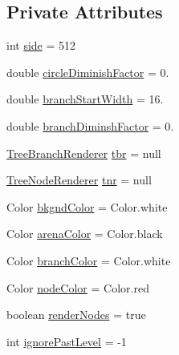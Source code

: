 \subsection*{Private Attributes}
\begin{DoxyCompactItemize}
\item 
int \hyperlink{classorg_1_1jgap_1_1util_1_1tree_1_1_tree_visualizer_a781fb40c6010a7b7da02446826b1d92a}{side} = 512
\item 
double \hyperlink{classorg_1_1jgap_1_1util_1_1tree_1_1_tree_visualizer_a3ff42c595d610aaa23f2102a0a590930}{circle\-Diminish\-Factor} = 0.
\item 
double \hyperlink{classorg_1_1jgap_1_1util_1_1tree_1_1_tree_visualizer_a4ddc046f06eb478f9fdf02ece6177acd}{branch\-Start\-Width} = 16.
\item 
double \hyperlink{classorg_1_1jgap_1_1util_1_1tree_1_1_tree_visualizer_a6022c22665671a626286f6b837759679}{branch\-Diminsh\-Factor} = 0.
\item 
\hyperlink{interfaceorg_1_1jgap_1_1util_1_1tree_1_1_tree_branch_renderer}{Tree\-Branch\-Renderer} \hyperlink{classorg_1_1jgap_1_1util_1_1tree_1_1_tree_visualizer_a3df4f6da758083da9c844f0f46d81b31}{tbr} = null
\item 
\hyperlink{interfaceorg_1_1jgap_1_1util_1_1tree_1_1_tree_node_renderer}{Tree\-Node\-Renderer} \hyperlink{classorg_1_1jgap_1_1util_1_1tree_1_1_tree_visualizer_a506cac5d7eb4e280016146f321b921fa}{tnr} = null
\item 
Color \hyperlink{classorg_1_1jgap_1_1util_1_1tree_1_1_tree_visualizer_a9ea1406597b394ba784c5a95c6c5b648}{bkgnd\-Color} = Color.\-white
\item 
Color \hyperlink{classorg_1_1jgap_1_1util_1_1tree_1_1_tree_visualizer_a8712811664d9f38c502af5612d001021}{arena\-Color} = Color.\-black
\item 
Color \hyperlink{classorg_1_1jgap_1_1util_1_1tree_1_1_tree_visualizer_adc14970d9e51cd9ac7ec634891cdcc93}{branch\-Color} = Color.\-white
\item 
Color \hyperlink{classorg_1_1jgap_1_1util_1_1tree_1_1_tree_visualizer_ae95f328ad72f53d508eb50c83b2bceac}{node\-Color} = Color.\-red
\item 
boolean \hyperlink{classorg_1_1jgap_1_1util_1_1tree_1_1_tree_visualizer_a1ae0b34cf547dbd9587346f304f71e9f}{render\-Nodes} = true
\item 
int \hyperlink{classorg_1_1jgap_1_1util_1_1tree_1_1_tree_visualizer_a3bc565082bafb781ffd45e32def3c1ac}{ignore\-Past\-Level} = -\/1
\end{DoxyCompactItemize}
